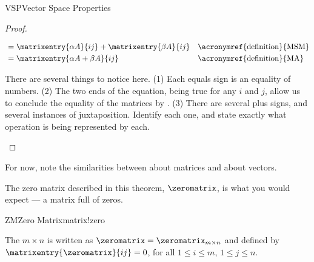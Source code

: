 \begin{subsect}{VSP}{Vector Space Properties}
\begin{proof}
\begin{para}
\begin{align*}
&=\matrixentry{\alpha A}{ij}+\matrixentry{\beta A}{ij}&&\text{\acronymref{definition}{MSM}}\\
&=\matrixentry{\alpha A+\beta A}{ij}&&\text{\acronymref{definition}{MA}}
\end{align*}
\end{para}
%
\begin{para}There are several things to notice here.  (1)  Each equals sign is an equality of numbers.  (2) The two ends of the equation, being true for any $i$ and $j$, allow us to conclude the equality of the matrices by .  (3)  There are several plus signs, and several instances of juxtaposition.  Identify each one, and state exactly what operation is being represented by each.\end{para}
%
\end{proof}
%
\begin{para}For now, note the similarities between  about matrices and  about vectors.\end{para}
%
\begin{para}The zero matrix described in this theorem, $\zeromatrix$, is what you would expect --- a matrix full of zeros.\end{para}
%
\begin{definition}{ZM}{Zero Matrix}{matrix!zero}
\begin{para}The $m\times n$  is written as $\zeromatrix=\zeromatrix_{m\times n}$ and defined by $\matrixentry{\zeromatrix}{ij}=0$, for all $1\leq i\leq m$, $1\leq j\leq n$.\end{para}
\end{definition}
%
\end{subsect}
%
